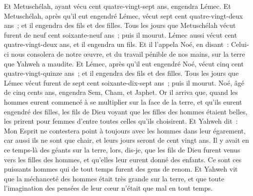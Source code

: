 \begin{multicols}{2}
Et Metuschélah, ayant vécu cent quatre-vingt-sept ans, engendra Lémec.
Et Metuschélah, après qu'il eut engendré Lémec, vécut sept cent quatre-vingt-deux ans~; et il engendra des fils et des filles.
Tous les jours que Metuschélah vécut furent de neuf cent soixante-neuf ans~; puis il mourut.
Lémec aussi vécut cent quatre-vingt-deux ans, et il engendra un fils.
Et il l'appela Noé, en disant~: Celui-ci nous consolera de notre œuvre, et du travail pénible de nos mains, sur la terre que Yahweh a maudite.
Et Lémec, après qu'il eut engendré Noé, vécut cinq cent quatre-vingt-quinze ans~; et il engendra des fils et des filles.
Tous les jours que Lémec vécut furent de sept cent soixante-dix-sept ans~; puis il mourut.
Noé, âgé de cinq cents ans, engendra Sem, Cham, et Japhet.
\VerseOne{}Or il arriva que, quand les hommes eurent commencé à se multiplier sur la face de la terre, et qu'ils eurent engendré des filles,
les fils de Dieu voyant que les filles des hommes étaient belles, les prirent pour femmes d'entre toutes celles qu'ils choisirent.
Et Yahweh dit~: Mon Esprit ne contestera point à toujours avec les hommes dans leur égarement, car aussi ils ne sont que chair, et leurs jours seront de cent vingt ans.
Il y avait en ce temps-là des géants sur la terre, lors, dis-je, que les fils de Dieu furent venus vers les filles des hommes, et qu'elles leur eurent donné des enfants. Ce sont ces puissants hommes qui de tout temps furent des gens de renom.
Et Yahweh vit que la méchanceté des hommes était très grande sur la terre, et que toute l'imagination des pensées de leur cœur n'était que mal en tout temps.

\end{multicols}
